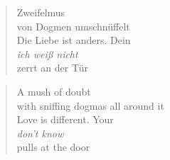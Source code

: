 
\cleartoverso


\begin{verse}

Zweifelmus\\
von Dogmen umschnüffelt\\
Die Liebe ist anders. Dein\\
\emph{ich weiß nicht}\\
zerrt an der Tür

\end{verse}

\clearpage


\begin{verse}

A mush of doubt\\
with sniffing dogmas all around it\\
Love is different. Your\\
\emph{don't know}\\
pulls at the door

\end{verse}
